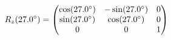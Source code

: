 \documentclass[preview]{standalone}
\begin{document}
\begin{align*}
\special{dvisvgm:raw <g id='unique000'>}R_z(27.0^\circ) = \begin{pmatrix} \cos(27.0^\circ) & -\sin(27.0^\circ) & 0 \\ \sin(27.0^\circ) & \cos(27.0^\circ) & 0 \\ 0 & 0 & 1 \end{pmatrix}\special{dvisvgm:raw </g>}
\end{align*}
\end{document}
